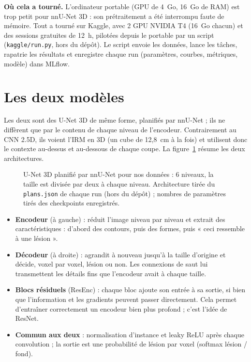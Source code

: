 \textbf{Où cela a tourné.} L'ordinateur portable (GPU de 4~Go, 16~Go de RAM) est trop petit pour nnU-Net 3D : son prétraitement a été interrompu faute de mémoire.
Tout a tourné sur Kaggle, avec 2 GPU NVIDIA T4 (16~Go chacun) et des sessions gratuites de 12~h, pilotées depuis le portable par un script (\nolinkurl{kaggle/run.py}, hors du dépôt).
Le script envoie les données, lance les tâches, rapatrie les résultats et enregistre chaque run (paramètres, courbes, métriques, modèle) dans MLflow.

\section{Les deux modèles}
\label{sec:anas-modeles}

Les deux sont des U-Net 3D de même forme, planifiés par nnU-Net ; ils ne diffèrent que par le contenu de chaque niveau de l'encodeur.
Contrairement au CNN 2.5D, ils voient l'IRM en 3D (un cube de 12,8~cm à la fois) et utilisent donc le contexte au-dessus et au-dessous de chaque coupe.
La figure~\ref{fig:anas-architecture} résume les deux architectures.

\begin{figure}[htbp]
  \centering
  \caption{U-Net 3D planifié par nnU-Net pour nos données : 6 niveaux, la taille est divisée par deux à chaque niveau. Architecture tirée du \texttt{plans.json} de chaque run (hors du dépôt) ; nombres de paramètres tirés des checkpoints enregistrés.}
  \label{fig:anas-architecture}
\end{figure}

\begin{itemize}
  \item \textbf{Encodeur} (à gauche) : réduit l'image niveau par niveau et extrait des caractéristiques : d'abord des contours, puis des formes, puis « ceci ressemble à une lésion ».
  \item \textbf{Décodeur} (à droite) : agrandit à nouveau jusqu'à la taille d'origine et décide, voxel par voxel, lésion ou non. Les connexions de saut lui transmettent les détails fins que l'encodeur avait à chaque taille.
  \item \textbf{Blocs résiduels} (ResEnc) : chaque bloc ajoute son entrée à sa sortie, si bien que l'information et les gradients peuvent passer directement. Cela permet d'entraîner correctement un encodeur bien plus profond ; c'est l'idée de ResNet.
  \item \textbf{Commun aux deux} : normalisation d'instance et leaky ReLU après chaque convolution ; la sortie est une probabilité de lésion par voxel (softmax lésion / fond).
\end{itemize}


